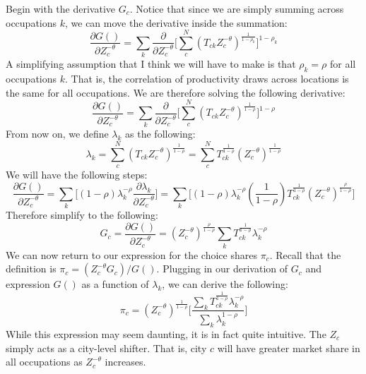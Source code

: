\documentclass[12pt]{article}
\begin{document}
Begin with the derivative $G_{c}$. Notice that since we are simply summing across occupations $k$, we can move the derivative inside the summation:
\begin{equation*}
    \frac{\partial{G()}}{\partial{Z_{c}^{-\theta}}} = \sum\limits_{k}\frac{\partial}{\partial{Z_{c}^{-\theta}}}\Big[\sum\limits_{c}^{N}({T_{ck}}{Z_{c}^{-\theta}})^{\frac{1}{1-\rho_{k}}}\Big]^{1-\rho_{k}}
\end{equation*}
A simplifying assumption that I think we will have to make is that $\rho_{k}=\rho$ for all occupations $k$. That is, the correlation of productivity draws across locations is the same for all occupations. We are therefore solving the following derivative:
\begin{equation*}
    \frac{\partial{G()}}{\partial{Z_{c}^{-\theta}}} = \sum\limits_{k}\frac{\partial}{\partial{Z_{c}^{-\theta}}}\Big[\sum\limits_{c}^{N}({T_{ck}}{Z_{c}^{-\theta}})^{\frac{1}{1-\rho}}\Big]^{1-\rho}
\end{equation*}
From now on, we define $\lambda_{k}$ as the following:
\begin{equation*}
    \lambda_{k} = \sum\limits_{c}^{N}({T_{ck}}{Z_{c}^{-\theta}})^{\frac{1}{1-\rho}} = \sum\limits_{c}^{N}{T^{\frac{1}{1-\rho}}_{ck}}(Z_{c}^{-\theta})^{\frac{1}{1-\rho}}
\end{equation*}
We will have the following steps:
\begin{equation*}
    \frac{\partial{G()}}{\partial{Z_{c}^{-\theta}}} = \sum\limits_{k}\Big[(1-\rho)\lambda^{-\rho}_{k}\frac{\partial{\lambda_{k}}}{\partial{Z_{c}^{-\theta}}}\Big] = \sum\limits_{k}\Big[(1-\rho)\lambda^{-\rho}_{k}(\frac{1}{1-\rho}){T^{\frac{1}{1-\rho}}_{ck}}(Z_{c}^{-\theta})^{\frac{\rho}{1-\rho}}\Big]
\end{equation*}
Therefore simplify to the following:
\begin{equation*}
    G_{c} = \frac{\partial{G()}}{\partial{Z_{c}^{-\theta}}} = (Z_{c}^{-\theta})^{\frac{\rho}{1-\rho}}\sum\limits_{k}{T^{\frac{1}{1-\rho}}_{ck}}\lambda_{k}^{-\rho}
\end{equation*}
We can now return to our expression for the choice shares $\pi_{c}$. Recall that the definition is $\pi_{c}=(Z_{c}^{-\theta}{G_{c}})/G()$. Plugging in our derivation of $G_{c}$ and expression $G()$ as a function of $\lambda_{k}$, we can derive the following:
\begin{equation}
    \pi_{c} = (Z_{c}^{-\theta})^{\frac{1}{1-\rho}}\Bigg[\frac{\sum\limits_{k}{T^{\frac{1}{1-\rho}}_{ck}}\lambda_{k}^{-\rho}}{\sum\limits_{k}\lambda_{k}^{1-\rho}}\Bigg]
\end{equation}
While this expression may seem daunting, it is in fact quite intuitive. The $Z_{c}$ simply acts as a city-level shifter. That is, city $c$ will have greater market share in all occupations as $Z_{c}^{-\theta}$ increases.
\end{document}
